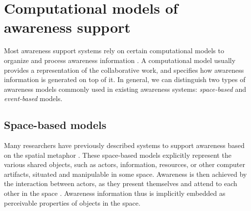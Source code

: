 \section{Computational models of awareness support} %
\label{sec:awareness_models}
Most awareness support systems rely on certain computational models to organize and process awareness information \cite{Gross2004}. A computational model usually provides a representation of the collaborative work, and specifies how awareness information is generated on top of it. In general, we can distinguish two types of awareness models commonly used in existing awareness systems: \emph{space-based} and \emph{event-based} models. 

\subsection{Space-based models} %
\label{sub:space_based_model}
Many researchers have previously described systems to support awareness based on the spatial metaphor \cite{Benford1993,Rodden1996,Sandor1997,simone2002a}. These space-based models explicitly represent the various shared objects, such as actors, information, resources, or other computer artifacts, situated and manipulable in some space. Awareness is then achieved by the interaction between actors, as they present themselves and attend to each other in the space \cite{Rodden1996}. Awareness information thus is implicitly embedded as perceivable properties of objects in the space.  

